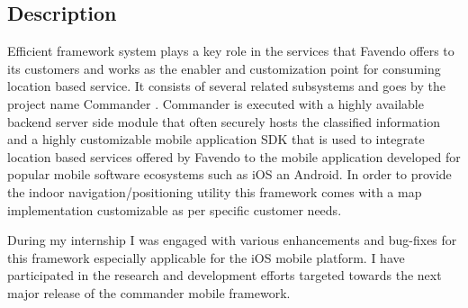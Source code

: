 \subsection{Description}
Efficient framework system plays a key role in the services that Favendo offers to its customers and works as the enabler and customization point for consuming location based service. It consists of several related subsystems and goes by the project name Commander \cite{commanderfavendo}. Commander is executed with a highly available backend server side module that often securely hosts the classified information and a highly customizable mobile application SDK that is used to integrate location based services offered by Favendo to the mobile application developed for popular mobile software ecosystems such as iOS an Android. In order to provide the indoor navigation/positioning utility this framework comes with a map implementation customizable as per specific customer needs.

\par During my internship I was engaged with various enhancements and bug-fixes for this framework especially applicable for the iOS mobile platform. I have participated in the research and development efforts targeted towards the next major release of the commander mobile framework.